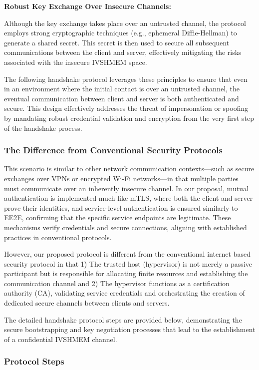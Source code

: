 \documentclass[conference]{IEEEtran}
\begin{document}
\textbf{Robust Key Exchange Over Insecure Channels:}

Although the key exchange takes place over an untrusted channel, the protocol
employs strong cryptographic techniques (e.g., ephemeral Diffie-Hellman) to
generate a shared secret. This secret is then used to secure all subsequent
communications between the client and server, effectively mitigating the risks
associated with the insecure IVSHMEM space.

The following handshake protocol leverages these principles to ensure that even
in an environment where the initial contact is over an untrusted channel, the
eventual communication between client and server is both authenticated and
secure. This design effectively addresses the threat of impersonation or
spoofing by mandating robust credential validation and encryption from the very
first step of the handshake process.

\subsubsection{The Difference from Conventional Security Protocols}

This scenario is similar to other network communication contexts—such as secure
exchanges over VPNs or encrypted Wi-Fi networks—in that multiple parties must
communicate over an inherently insecure channel. In our proposal, mutual
authentication is implemented much like mTLS, where both the client and server
prove their identities, and service-level authentication is ensured similarly
to EE2E, confirming that the specific service endpoints are legitimate. These
mechanisms verify credentials and secure connections, aligning with established
practices in conventional protocols.

However, our proposed protocol is different from the conventional internet
based security protocol in that 1) The trusted host (hypervisor) is not merely
a passive participant but is responsible for allocating finite resources and
establishing the communication channel and 2) The hypervisor functions as a
certification authority (CA), validating service credentials and orchestrating
the creation of dedicated secure channels between clients and servers.

The detailed handshake protocol steps are provided below, demonstrating the
secure bootstrapping and key negotiation processes that lead to the
establishment of a confidential IVSHMEM channel.

\subsubsection{Protocol Steps}
\end{document}
